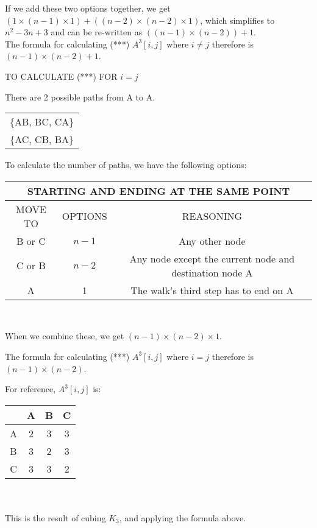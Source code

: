 \documentclass[12pt]{article}
\begin{document}
If we add these two options together, we get $(1 \times (n-1) \times 1) +  ((n-2) \times (n-2) \times 1)$, which simplifies to $n^{2} - 3n +3$ and can be re-written as $((n-1) \times (n-2)) + 1$. \\


The formula for calculating (***) $A^{3}[i, j]$ where $i \neq j$ therefore is $(n-1) \times (n-2) + 1$.

\begin{center}
\Large TO CALCULATE (***) FOR $i = j$
\end{center}
\normalsize

There are 2 possible paths from A to A. \\
\begin{center}
\begin{tabular}{|c|}  \hline
\{AB, BC, CA\} \\
\{AC, CB, BA\} \\ \hline
\end{tabular}
\end{center}

To calculate the number of paths, we have the following options: \\
\begin{center}
\begin{tabular}{|c|c|c|}
\multicolumn{3}{c}{STARTING AND ENDING AT THE SAME POINT}  \\ \hline
MOVE TO & OPTIONS & REASONING \\ \hline
B or C & $n-1$ & Any other node\\ \hline
C or B &$n-2$ & Any node except the current node and destination node A \\ \hline
A & 1 & The walk's third step has to end on A \\ \hline
\end{tabular} \\
\end{center}

When we combine these, we get $(n-1) \times (n-2) \times 1$.

The formula for calculating (***) $A^{3}[i, j]$ where $i = j$ therefore is $(n-1) \times (n-2)$.

For reference, $A^{3}[i,j]$ is:
\begin{tabular}{|c|c|c|c|} \hline
 & A & B & C \\ \hline
 A & 2 & 3 & 3 \\ \hline
 B & 3 & 2 & 3 \\ \hline
 C & 3 & 3 & 2 \\ \hline
 \end{tabular} \\ \\
 This is the result of cubing $K_3$, and applying the formula above. \\
\end{document}
